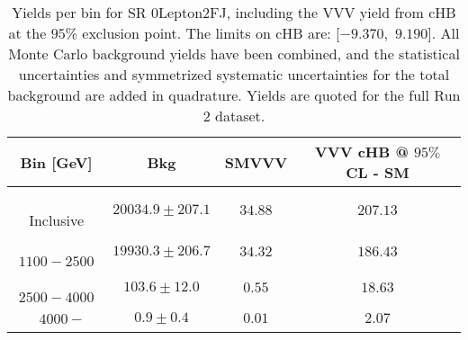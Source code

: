 \begin{table}[!htbp]
    \small
    \center
    \begin{tabular}{c||c|c|c}
    Bin [GeV] & Bkg & SMVVV & \pbox{20cm}{VVV \\ cHB @ $95\%$ CL - SM \\ }\\
    \hline
    \pbox{20cm}{ ~ \\Inclusive\\ } & $20034.9 \pm 207.1$ & $34.88$ & $207.13$\\
    \hline
    \pbox{20cm}{ ~ \\$1100-2500$\\ } & $19930.3 \pm 206.7$ & $34.32$ & $186.43$\\
    \hline
    \pbox{20cm}{ ~ \\$2500-4000$\\ } & $103.6 \pm 12.0$ & $0.55$ & $18.63$\\
    \hline
    \pbox{20cm}{ ~ \\$4000-$\\ } & $0.9 \pm 0.4$ & $0.01$ & $2.07$\\
\end{tabular}
    \caption{Yields per bin for SR 0Lepton2FJ, including the VVV yield from cHB at the $95$\% exclusion point. The limits on cHB are: [$-9.370$,~$9.190$]. All Monte Carlo background yields have been combined, and the statistical uncertainties and symmetrized systematic uncertainties for the total background are added in quadrature. Yields are quoted for the full Run 2 dataset.}
    \label{tab:0Lepton2FJ$binssignal}
\end{table}
